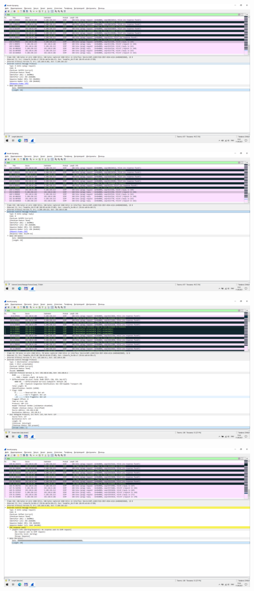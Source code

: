 \includegraphics[width=\textwidth]{screenshots/tracert-d_success_request_1}

\includegraphics[width=\textwidth]{screenshots/tracert-d_success_response_1}

\includegraphics[width=\textwidth]{screenshots/tracert_port_1}

\includegraphics[width=\textwidth]{screenshots/tracert_ttl_request_1}

